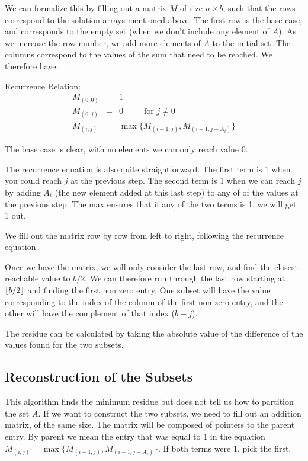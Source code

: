\documentclass[11pt]{article}
\DeclarePairedDelimiter\floor{\lfloor}{\rfloor}
\begin{document}
We can formalize this by filling out a matrix $M$ of size $n\times b$, such that the rows correspond to the solution arrays mentioned above. The first row is the base case, and corresponds to the empty set (when we don't include any element of $A$). As we increase the row number, we add more elements of $A$ to the initial set. The columns correspond to the values of the sum that need to be reached.
We therefore have:

Recurrence Relation:
\begin{eqnarray}
M_{(0,0)} &=& 1\\
M_{(0,j)} &=& 0 \;\;\;\;\;\;\;\;\;\text{for $j \neq 0$}\\
M_{(i,j)}&=&\max\{M_{(i-1,j)},M_{(i-1,j-A_i)}\}
\end{eqnarray}

The base case is clear, with no elements we can only reach value 0.

The recurrence equation is also quite straightforward. The first term is 1 when you could reach $j$ at the previous step. The second term is 1 when we can reach $j$ by adding $A_i$ (the new element added at this last step) to any of of the values at the previous step. The max ensures that if any of the two terms is 1, we will get 1 out.

We fill out the matrix row by row from left to right, following the recurrence equation.

Once we have the matrix, we will only consider the last row, and find the closest reachable value to $b/2$. We can therefore run through the last row starting at $\floor*{b/2}$ and finding the first non zero entry. One subset will have the value corresponding to the index of the column of the first non zero entry, and the other will have the complement of that index ($b-j$).

The residue can be calculated by taking the absolute value of the difference of the values found for the two subsets.

\subsection{Reconstruction of the Subsets}
This algorithm finds the minimum residue but does not tell us how to partition the set $A$. If we want to construct the two subsets, we need to fill out an addition matrix, of the same size. The matrix will be composed of pointers to the parent entry. By parent we mean the entry that was equal to 1 in the equation $M_{(i,j)}=\max\{M_{(i-1,j)},M_{(i-1,j-A_i)}\}$. If both terms were 1, pick the first.
\end{document}
